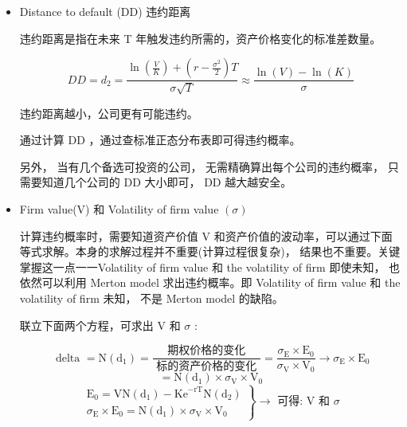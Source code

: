 \begin{itemize}
\begin{itemize}
\begin{itemize}
N(X): Standard normal cumulative distribution function.

\(\mathrm{N}\left( {\mathrm{d}}_{1}\right)\) : Delta of call option

\(\mathrm{N}\left( {\mathrm{d}}_{2}\right)\) : Risk-neutral probability of call exercise 行权概率

\item Distance to default (DD) 违约距离

违约距离是指在未来 T 年触发违约所需的，资产价格变化的标准差数量。

\[
{DD} = {d}_{2} = \frac{\ln \left( \frac{V}{K}\right)  + \left( {r - \frac{{\sigma }^{2}}{2}}\right) T}{\sigma \sqrt{T}} \approx  \frac{\ln \left( V\right)  - \ln \left( K\right) }{\sigma }
\]

违约距离越小，公司更有可能违约。

通过计算 \(\mathrm{{DD}}\) ，通过查标准正态分布表即可得违约概率。

另外， 当有几个备选可投资的公司， 无需精确算出每个公司的违约概率， 只需要知道几个公司的 DD 大小即可， DD 越大越安全。

\item Firm value(V) 和 Volatility of firm value \(\left( \sigma \right)\)

计算违约概率时，需要知道资产价值 \(\mathrm{V}\) 和资产价值的波动率，可以通过下面等式求解。本身的求解过程并不重要(计算过程很复杂)， 结果也不重要。关键掌握这一点一一Volatility of firm value 和 the volatility of firm 即使未知， 也依然可以利用 Merton model 求出违约概率。即 Volatility of firm value 和 the volatility of firm 未知， 不是 Merton model 的缺陷。

联立下面两个方程，可求出 \(\mathrm{V}\) 和 \(\sigma\) :

\[\text{ delta } = \mathrm{N}\left( {\mathrm{d}}_{1}\right)  = \frac{\text{ 期权价格的变化 }}{\text{ 标的资产价格的变化 }} = \frac{{\sigma }_{\mathrm{E}} \times  {\mathrm{E}}_{0}}{{\sigma }_{\mathrm{V}} \times  {\mathrm{V}}_{0}} \rightarrow  {\sigma }_{\mathrm{E}} \times  {\mathrm{E}}_{0}\]
\[= \mathrm{N}\left( {\mathrm{d}}_{1}\right)  \times  {\sigma }_{\mathrm{V}} \times  {\mathrm{V}}_{0}\]
\[\left. \begin{array}{l} {\mathrm{E}}_{0} = \mathrm{{VN}}\left( {\mathrm{d}}_{1}\right)  - {\mathrm{{Ke}}}^{-\mathrm{{rT}}}\mathrm{N}\left( {\mathrm{d}}_{2}\right) \\  {\sigma }_{\mathrm{E}} \times  {\mathrm{E}}_{0} = \mathrm{N}\left( {\mathrm{d}}_{1}\right)  \times  {\sigma }_{\mathrm{V}} \times  {\mathrm{V}}_{0} \end{array}\right\}   \rightarrow  \text{ 可得: }\mathrm{V}\text{ 和 }\sigma\]
\end{itemize}


\end{itemize}
\end{itemize}
